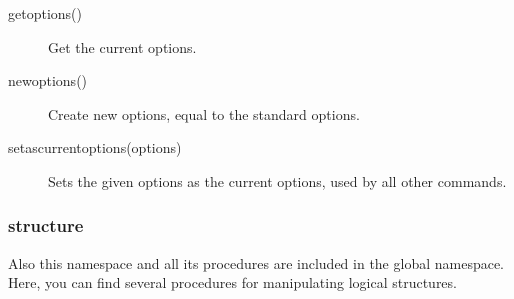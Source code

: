 \begin{description}
	\item[getoptions()]
 		Get the current options.
	\item[newoptions()]
 		Create new options, equal to the standard options.
	\item[setascurrentoptions(options)]
 		Sets the given options as the current options, used by all other commands.
\end{description}

\subsubsection{structure}
Also this  namespace and all its procedures are included in the global namespace. Here, you can find several procedures for manipulating logical structures.

